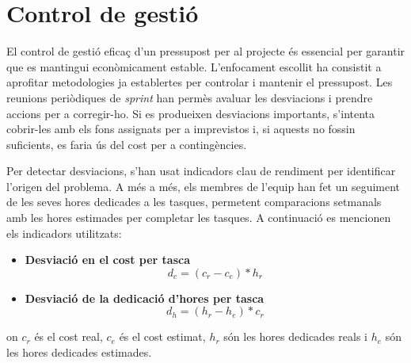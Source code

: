 \section{Control de gestió}
El control de gestió eficaç d'un pressupost per al projecte és essencial per garantir que es mantingui econòmicament estable. L'enfocament escollit ha consistit a aprofitar metodologies ja establertes per controlar i mantenir el pressupost. Les reunions periòdiques de \textit{sprint} han permès avaluar les desviacions i prendre accions per a corregir-ho. Si es produeixen desviacions importants, s'intenta cobrir-les amb els fons assignats per a imprevistos i, si aquests no fossin suficients, es faria ús del cost per a contingències.

Per detectar desviacions, s'han usat indicadors clau de rendiment per identificar l'origen del problema. A més a més, els membres de l'equip han fet un seguiment de les seves hores dedicades a les tasques, permetent comparacions setmanals amb les hores estimades per completar les tasques. A continuació es mencionen els indicadors utilitzats:

\begin{itemize}
    \item \textbf{Desviació en el cost per tasca}
    \[d_c = (c_r - c_e) * h_r\]
    \item \textbf{Desviació de la dedicació d'hores per tasca}
    \[d_h = (h_r - h_e) * c_r\]
\end{itemize}

on $c_r$ és el cost real, $c_e$ és el cost estimat, $h_r$ són les hores dedicades reals i $h_e$ són les hores dedicades estimades.